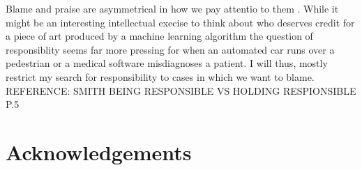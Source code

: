 \documentclass{article}
\begin{document}
Blame and praise are asymmetrical in how we pay attentio to them . While it
might be an interesting intellectual execise to think about who deserves credit
for a piece of art produced by a machine learning algorithm the question of
responsiblity seems far more pressing for when an automated car runs over a
pedestrian or a medical software misdiagnoses a patient. I will thus, mostly
restrict my search for responsibility to cases in which we want to blame.
REFERENCE: SMITH BEING RESPONSIBLE VS HOLDING RESPIONSIBLE P.5
\section{Acknowledgements}
\clearpage

\printglossary[type=\acronymtype]
\printglossary
\printbibliography
\end{document}
